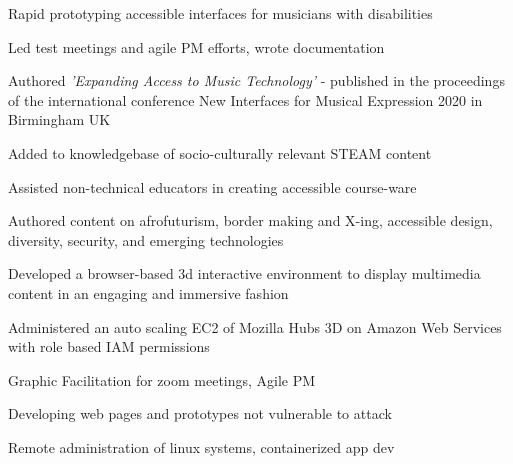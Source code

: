 \documentclass[]{quinnJarvisHollandLatex}
\begin{document}
\begin{minipage}[t]{0.60\textwidth}
\begin{tightemize}
\item Rapid prototyping accessible interfaces for musicians with disabilities
\item Led test meetings and agile PM efforts, wrote documentation
\item Authored \textit{'Expanding Access to Music Technology' } - published in the proceedings of the international conference New Interfaces for Musical Expression 2020 in Birmingham UK
\end{tightemize}

\begin{tightemize}
\item Added to knowledgebase of socio-culturally relevant STEAM content
\item Assisted non-technical educators in creating accessible course-ware
\item Authored content on afrofuturism, border making and X-ing, accessible design, diversity, security, and emerging technologies
\item Developed a browser-based 3d interactive environment to display multimedia content in an engaging and immersive fashion
\item Administered an auto scaling EC2 of Mozilla Hubs 3D on Amazon Web Services with role based IAM permissions
\end{tightemize}

\begin{tightemize}
\item Graphic Facilitation for zoom meetings, Agile PM
\item Developing web pages and prototypes not vulnerable to attack
\item Remote administration of linux systems, containerized app dev
\end{tightemize}
%
%

\end{minipage}
\end{document}
